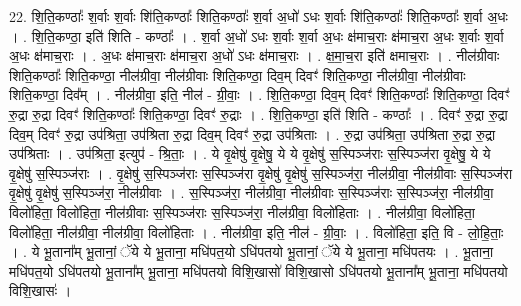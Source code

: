 \documentclass[17pt]{extarticle}
\begin{document}
22. शि॒ति॒कण्ठाः᳚ श॒र्वाः श॒र्वाः शि॑ति॒कण्ठाः᳚ शिति॒कण्ठाः᳚ श॒र्वा अ॒धो॑ ऽधः श॒र्वाः शि॑ति॒कण्ठाः᳚ शिति॒कण्ठाः᳚ श॒र्वा अ॒धः । . शि॒ति॒कण्ठा॒ इति॑ शिति - कण्ठाः᳚ । . श॒र्वा अ॒धो॑ ऽधः श॒र्वाः श॒र्वा अ॒धः क्ष॑माच॒राः क्ष॑माच॒रा अ॒धः श॒र्वाः श॒र्वा अ॒धः क्ष॑माच॒राः । . अ॒धः क्ष॑माच॒राः क्ष॑माच॒रा अ॒धो॑ ऽधः क्ष॑माच॒राः । . क्ष॒मा॒च॒रा इति॑ क्षमाच॒राः । . नील॑ग्रीवाः शिति॒कण्ठाः᳚ शिति॒कण्ठा॒ नील॑ग्रीवा॒ नील॑ग्रीवाः शिति॒कण्ठा॒ दिव॒म् दिवꣳ॑ शिति॒कण्ठा॒ नील॑ग्रीवा॒ नील॑ग्रीवाः शिति॒कण्ठा॒ दिव᳚म् । . नील॑ग्रीवा॒ इति॒ नील॑ - ग्री॒वाः॒ । . शि॒ति॒कण्ठा॒ दिव॒म् दिवꣳ॑ शिति॒कण्ठाः᳚ शिति॒कण्ठा॒ दिवꣳ॑ रु॒द्रा रु॒द्रा दिवꣳ॑ शिति॒कण्ठाः᳚ शिति॒कण्ठा॒ दिवꣳ॑ रु॒द्राः । . शि॒ति॒कण्ठा॒ इति॑ शिति - कण्ठाः᳚ । . दिवꣳ॑ रु॒द्रा रु॒द्रा दिव॒म् दिवꣳ॑ रु॒द्रा उप॑श्रिता॒ उप॑श्रिता रु॒द्रा दिव॒म् दिवꣳ॑ रु॒द्रा उप॑श्रिताः । . रु॒द्रा उप॑श्रिता॒ उप॑श्रिता रु॒द्रा रु॒द्रा उप॑श्रिताः । . उप॑श्रिता॒ इत्युप॑ - श्रि॒ताः॒ । . ये वृ॒क्षेषु॑ वृ॒क्षेषु॒ ये ये वृ॒क्षेषु॑ स॒स्पिञ्ज॑राः स॒स्पिञ्ज॑रा वृ॒क्षेषु॒ ये ये वृ॒क्षेषु॑ स॒स्पिञ्ज॑राः । . वृ॒क्षेषु॑ स॒स्पिञ्ज॑राः स॒स्पिञ्ज॑रा वृ॒क्षेषु॑ वृ॒क्षेषु॑ स॒स्पिञ्ज॑रा॒ नील॑ग्रीवा॒ नील॑ग्रीवाः स॒स्पिञ्ज॑रा वृ॒क्षेषु॑ वृ॒क्षेषु॑ स॒स्पिञ्ज॑रा॒ नील॑ग्रीवाः । . स॒स्पिञ्ज॑रा॒ नील॑ग्रीवा॒ नील॑ग्रीवाः स॒स्पिञ्ज॑राः स॒स्पिञ्ज॑रा॒ नील॑ग्रीवा॒ विलो॑हिता॒ विलो॑हिता॒ नील॑ग्रीवाः स॒स्पिञ्ज॑राः स॒स्पिञ्ज॑रा॒ नील॑ग्रीवा॒ विलो॑हिताः । . नील॑ग्रीवा॒ विलो॑हिता॒ विलो॑हिता॒ नील॑ग्रीवा॒ नील॑ग्रीवा॒ विलो॑हिताः । . नील॑ग्रीवा॒ इति॒ नील॑ - ग्री॒वाः॒ । . विलो॑हिता॒ इति॒ वि - लो॒हि॒ताः॒ । . ये भू॒ताना᳚म् भू॒तानां॒ ॅये ये भू॒ताना॒ मधि॑पत॒यो ऽधि॑पतयो भू॒तानां॒ ॅये ये भू॒ताना॒ मधि॑पतयः । . भू॒ताना॒ मधि॑पत॒यो ऽधि॑पतयो भू॒ताना᳚म् भू॒ताना॒ मधि॑पतयो विशि॒खासो॑ विशि॒खासो ऽधि॑पतयो भू॒ताना᳚म् भू॒ताना॒ मधि॑पतयो विशि॒खासः॑ । \newline
\end{document}
